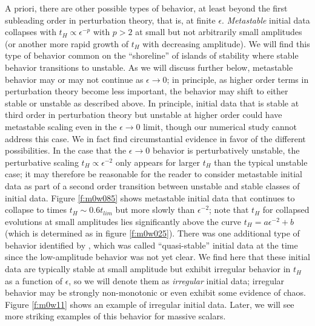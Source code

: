 \documentclass[../PhD.tex]{subfiles}
\begin{document}
A priori, there are other possible types of behavior, at least beyond
the first subleading order in perturbation theory, that is, at finite
$\epsilon$.
\textit{Metastable} initial data collapses with $t_H\propto\epsilon^{-p}$ with
$p>2$ at small but not arbitrarily small amplitudes 
(or another more rapid growth of $t_H$ with decreasing amplitude).  
We will find this type of behavior common on the
``shoreline'' of islands of stability where stable behavior transitions to
unstable.  As we will discuss further below, metastable
behavior may or may not continue as $\epsilon\to 0$;
in principle, as higher order terms in perturbation theory become less
important, the behavior may shift to either stable or unstable as described
above.  In principle, initial data that is stable at third order in
perturbation theory but unstable at higher order could have metastable
scaling even in the $\epsilon\to 0$ limit, though our numerical study cannot
address this case.
We in fact find circumstantial evidence in favor of the different
possibilities. In the case that the $\epsilon\to 0$ behavior is perturbatively
unstable, the perturbative scaling $t_H\propto \epsilon^{-2}$ only appears
for larger $t_H$ than the typical unstable case; it may therefore be
reasonable for the reader to consider metastable initial data as part of a
second order transition between unstable and stable classes of initial data.
Figure \ref{f:m0w085} shows metastable initial data that continues to collapse
to times $t_H\sim 0.6t_{lim}$ but more slowly than $\epsilon^{-2}$;
note that $t_H$ for collapsed evolutions at small amplitudes lies significantly
above the curve $t_H=a\epsilon^{-2}+b$ (which is determined as in
figure \ref{f:m0w025}).
There was one additional type of behavior identified by \cite{1508.02709},
which was called ``quasi-stable'' initial data at the time
since the low-amplitude
behavior was not yet clear.  We find here that these initial data are typically
stable at small amplitude but exhibit irregular
behavior in $t_H$ as a function of $\epsilon$, so we will denote them as
\textit{irregular} initial data; irregular behavior may be strongly 
non-monotonic or even exhibit some evidence of chaos.  
Figure \ref{f:m0w11} shows an example of
irregular initial data.  Later, we will see more striking examples of
this behavior for massive scalars.
\end{document}
